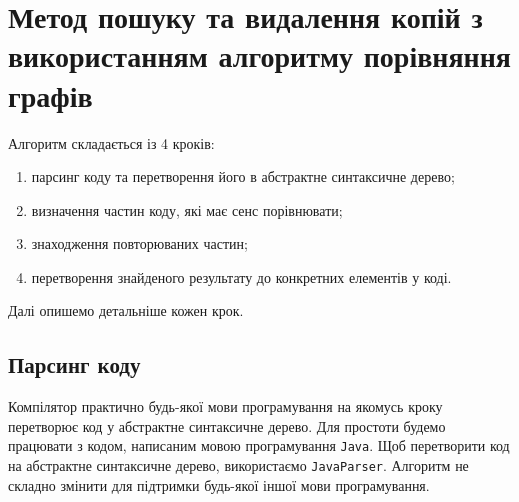 \documentclass[a4paper, 14pt]{article}
\begin{document}
\section{Метод пошуку та видалення копій з використанням алгоритму порівняння графів}
Алгоритм складається із 4 кроків:
\begin{enumerate}[label={{\arabic*})}]
\item парсинг коду та перетворення його в абстрактне синтаксичне дерево;
\item визначення частин коду, які має сенс порівнювати;
\item знаходження повторюваних частин;
\item перетворення знайденого результату до конкретних елементів у коді.
\end{enumerate}
Далі опишемо детальніше кожен крок.
\subsection{Парсинг коду}
Компілятор практично будь-якої мови програмування на якомусь кроку перетворює код у абстрактне синтаксичне дерево. Для простоти будемо працювати з кодом, написаним мовою програмування \verb|Java|. Щоб перетворити код на абстрактне синтаксичне дерево, використаємо \verb|JavaParser|. Алгоритм не складно змінити для підтримки будь-якої іншої мови програмування.
\end{document}
